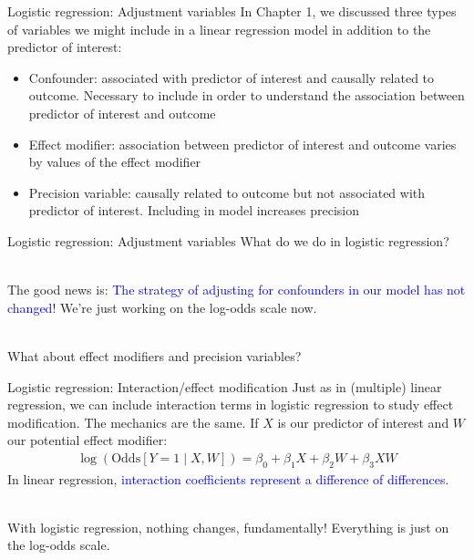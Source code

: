 \documentclass[10pt,t]{beamer}
\begin{document}
\begin{frame}{Logistic regression: Adjustment variables}
	In Chapter 1, we discussed three types of variables we might include in a linear regression model in addition to the predictor of interest:
	\begin{itemize}
		\item Confounder: associated with predictor of interest and causally related to outcome. Necessary to include in order to understand the association between predictor of interest and outcome
		\item Effect modifier: association between predictor of interest and outcome varies by values of the effect modifier 
		\item Precision variable: causally related to outcome but not associated with predictor of interest. Including in model increases precision
	\end{itemize}
\end{frame}

\begin{frame}{Logistic regression: Adjustment variables}
	What do we do in logistic regression?
	\\ ~\ 
	
	The good news is: \textcolor{blue}{The strategy of adjusting for confounders in our model has not changed!} We're just working on the log-odds scale now. 
	\\ ~\ 
	
	What about effect modifiers and precision variables?
\end{frame}

\begin{frame}{Logistic regression: Interaction/effect modification}
	Just as in (multiple) linear regression, we can include interaction terms in logistic regression to study effect modification. The mechanics are the same. If $X$ is our predictor of interest and $W$ our potential effect modifier: 
	\begin{align*}
				\log(\text{Odds}[Y = 1 \mid X, W]) = \beta_0 + \beta_1X + \beta_2W + \beta_3XW
	\end{align*}\pause
	In linear regression, \textcolor{blue}{interaction coefficients represent a difference of differences}.\pause
	\\ ~\ 
	
	With logistic regression, nothing changes, fundamentally! Everything is just on the log-odds scale. 
\end{frame}
\end{document}
